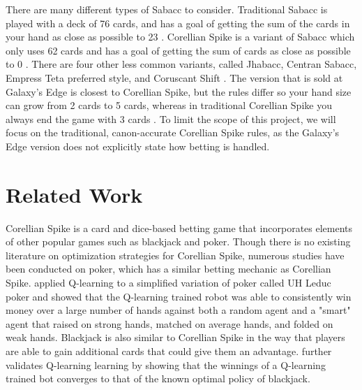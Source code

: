 \documentclass{article}
\begin{document}
There are many different types of Sabacc to consider. Traditional Sabacc is played with a deck of 76 cards, and has a goal of getting the sum of the cards in your hand as close as possible to 23 \cite{sabacc}. Corellian Spike is a variant of Sabacc which only uses 62 cards and has a goal of getting the sum of cards as close as possible to 0 \cite{spike}. There are four other less common variants, called Jhabacc, Centran Sabacc, Empress Teta preferred style, and Coruscant Shift \cite{sabacc}. The version that is sold at Galaxy's Edge is closest to Corellian Spike, but the rules differ so your hand size can grow from 2 cards to 5 cards, whereas in traditional Corellian Spike you always end the game with 3 cards \cite{spike}. To limit the scope of this project, we will focus on the traditional, canon-accurate Corellian Spike rules, as the Galaxy's Edge version does not explicitly state how betting is handled.

\section{Related Work} %

Corellian Spike is a card and dice-based betting game that incorporates elements of other popular games such as blackjack and poker. Though there is no existing literature on optimization strategies for Corellian Spike, numerous studies have been conducted on poker, which has a similar betting mechanic as Corellian Spike. \cite{RW_thesis} applied Q-learning to a simplified variation of poker called UH Leduc poker and showed that the Q-learning trained robot was able to consistently win money over a large number of hands against both a random agent and a "smart" agent that raised on strong hands, matched on average hands, and folded on weak hands.
Blackjack is also similar to Corellian Spike in the way that players are able to gain additional cards that could give them an advantage. \cite{Granville} further validates Q-learning learning by showing that the winnings of a Q-learning trained bot converges to that of the known optimal policy of blackjack.


\end{document}
